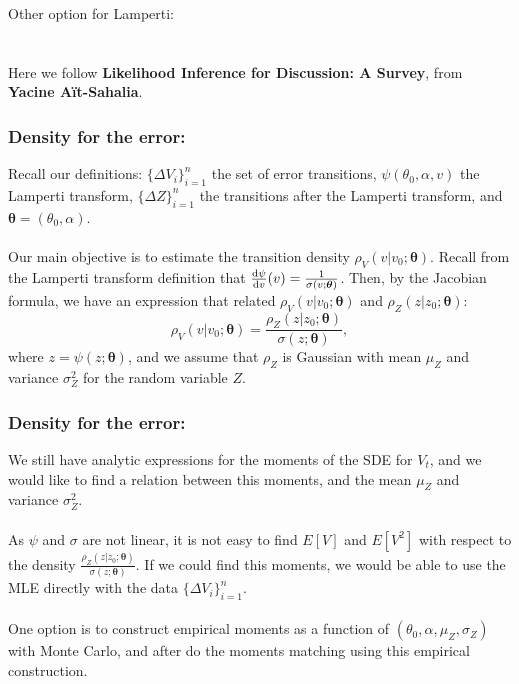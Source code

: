 \documentclass[aspectratio=169]{beamer}\usepackage[utf8]{inputenc}
\begin{document}

\begin{frame}

{\Huge Other option for Lamperti:}\\
\quad\\
\quad\\
Here we follow \textbf{Likelihood Inference for Discussion: A Survey}, from \textbf{Yacine A\"it-Sahalia}.

\end{frame}


\begin{frame}\frametitle{Density for the error:}

Recall our definitions: $\{\Delta V_i\}_{i=1}^n$ the set of error transitions, $\psi(\theta_0,\alpha,v)$ the Lamperti transform, $\{\Delta Z\}_{i=1}^n$ the transitions after the Lamperti transform, and $\bm{\theta}=(\theta_0,\alpha)$.\\
\quad\\
Our main objective is to estimate the transition density $\rho_V(v|v_0;\bm{\theta})$. Recall from the Lamperti transform definition that $\frac{\dif\psi}{\dif v}(v)=\frac{1}{\sigma(v;\bm{\theta})}$. Then, by the Jacobian formula, we have an expression that related $\rho_V(v|v_0;\bm{\theta})$ and $\rho_Z(z|z_0;\bm{\theta})$:
\begin{equation*}
\rho_V(v|v_0;\bm{\theta})=\frac{\rho_Z(z|z_0;\bm{\theta})}{\sigma(z;\bm{\theta})},
\end{equation*}
where $z=\psi(z;\bm{\theta})$, and we assume that $\rho_Z$ is Gaussian with mean $\mu_Z$ and variance $\sigma_Z^2$ for the random variable $Z$.

\end{frame}


\begin{frame}\frametitle{Density for the error:}

We still have analytic expressions for the moments of the SDE for $V_t$, and we would like to find a relation between this moments, and the mean $\mu_Z$ and variance $\sigma^2_Z$.\\
\quad\\
As $\psi$ and $\sigma$ are not linear, it is not easy to find $E[V]$ and $E[V^2]$ with respect to the density  $\frac{\rho_Z(z|z_0;\bm{\theta})}{\sigma(z;\bm{\theta})}$. If we could find this moments, we would be able to use the MLE directly with the data $\{\Delta V_i\}_{i=1}^n$.\\
\quad\\
One option is to construct empirical moments as a function of $(\theta_0,\alpha,\mu_Z,\sigma_Z)$ with Monte Carlo, and after do the moments matching using this empirical construction.

\end{frame}
\end{document}
